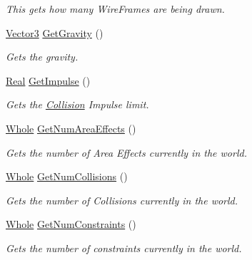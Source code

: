 \begin{DoxyCompactItemize}
\begin{DoxyCompactList}\small\item\em This gets how many WireFrames are being drawn. \item\end{DoxyCompactList}\item 
\hyperlink{classMezzanine_1_1Vector3}{Vector3} \hyperlink{classMezzanine_1_1PhysicsManager_aaad40d1888caa36c158dc6e94d63c068}{GetGravity} ()
\begin{DoxyCompactList}\small\item\em Gets the gravity. \item\end{DoxyCompactList}\item 
\hyperlink{namespaceMezzanine_a726731b1a7df72bf3583e4a97282c6f6}{Real} \hyperlink{classMezzanine_1_1PhysicsManager_a2c7e1ac9660cdc3b1a4bf2dbb9433288}{GetImpulse} ()
\begin{DoxyCompactList}\small\item\em Gets the \hyperlink{classMezzanine_1_1Collision}{Collision} Impulse limit. \item\end{DoxyCompactList}\item 
\hyperlink{namespaceMezzanine_adcbb6ce6d1eb4379d109e51171e2e493}{Whole} \hyperlink{classMezzanine_1_1PhysicsManager_a29d29a586387400426857fc2897b91dc}{GetNumAreaEffects} ()
\begin{DoxyCompactList}\small\item\em Gets the number of Area Effects currently in the world. \item\end{DoxyCompactList}\item 
\hyperlink{namespaceMezzanine_adcbb6ce6d1eb4379d109e51171e2e493}{Whole} \hyperlink{classMezzanine_1_1PhysicsManager_acadfd5d67fdc193a81ad726a2b41c748}{GetNumCollisions} ()
\begin{DoxyCompactList}\small\item\em Gets the number of Collisions currently in the world. \item\end{DoxyCompactList}\item 
\hyperlink{namespaceMezzanine_adcbb6ce6d1eb4379d109e51171e2e493}{Whole} \hyperlink{classMezzanine_1_1PhysicsManager_a7c29c81cb88d3a347433130614237eec}{GetNumConstraints} ()
\begin{DoxyCompactList}\small\item\em Gets the number of constraints currently in the world. \item\end{DoxyCompactList}\item 

\end{DoxyCompactItemize}
